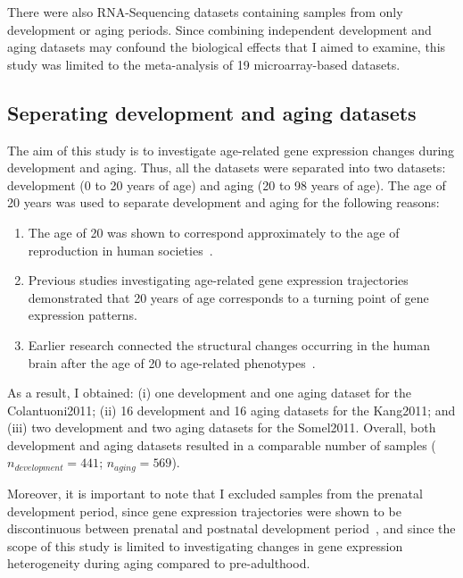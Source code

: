 There were also RNA-Sequencing datasets containing samples from only development or aging periods. 
Since combining independent development and aging datasets may confound the biological effects that I aimed to examine, 
this study was limited to the meta-analysis of 19 microarray-based datasets. 

\subsection{Seperating development and aging datasets}
The aim of this study is to investigate age-related gene expression changes during development and aging. 
Thus, all the datasets were separated into two datasets: development (0 to 20 years of age) and aging (20 to 98 years of age).
The age of 20 years was used to separate development and aging for the following reasons:
\begin{enumerate}
    \item The age of 20 was shown to correspond approximately to the age of reproduction in human societies~\cite{Walker2006}.
    \item Previous studies investigating age-related gene expression trajectories demonstrated that 20 years of age corresponds to a turning point of gene expression patterns\cite{Colantuoni2011, Donertas2017, Somel2010}.
    \item Earlier research connected the structural changes occurring in the human brain after the age of 20 to age-related phenotypes~\cite{Sowell2004}.
\end{enumerate}

As a result, I obtained: 
(i) one development and one aging dataset for the Colantuoni2011; 
(ii) 16 development and 16 aging datasets for the Kang2011; and
(iii) two development and two aging datasets for the Somel2011.
Overall, both development and aging datasets resulted in a comparable number of samples ($n_{development} = 441$; $n_{aging}=569$).

Moreover, it is important to note that I excluded samples from the prenatal development period, 
since gene expression trajectories were shown to be discontinuous between prenatal and postnatal development period~\cite{Colantuoni2011, Kang2011}, 
and since the scope of this study is limited to investigating changes in gene expression heterogeneity during aging compared to pre-adulthood.

